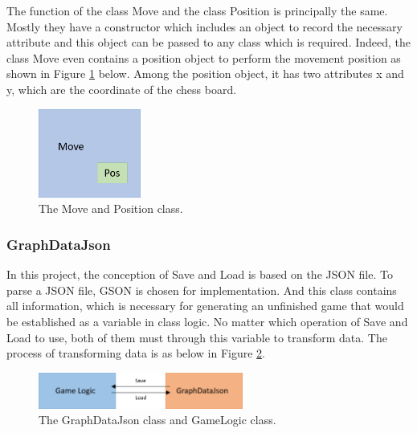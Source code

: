 The function of the class Move and the class Position is principally the same. Mostly they have a constructor which includes an object to record the necessary attribute and this object can be passed to any class which is required. Indeed, the class Move even contains a position object to perform the movement position as shown in Figure \ref{fig:moveAndPosition} below. Among the position object, it has two attributes x and y, which are the coordinate of the chess board.
  
\begin{figure}[h]
	\centering
	\includegraphics[width=0.3\textwidth]{image/diagram_6}
	\caption{The Move and Position class.}
	\label{fig:moveAndPosition}
\end{figure}


\subsubsection{GraphDataJson}

In this project, the conception of Save and Load is based on the JSON file. To parse a JSON file, GSON is chosen for implementation. And this class contains all information, which is necessary for generating an unfinished game that would be established as a variable in class logic. No matter which operation of Save and Load to use, both of them must through this variable to transform data. The process of transforming data is as below in Figure \ref{fig:GraphDataJson}.      

\begin{figure}[h]
	\centering
	\includegraphics[width=0.6\textwidth]{image/diagram_7}
	\caption{The GraphDataJson class and GameLogic class.}
	\label{fig:GraphDataJson}
\end{figure}